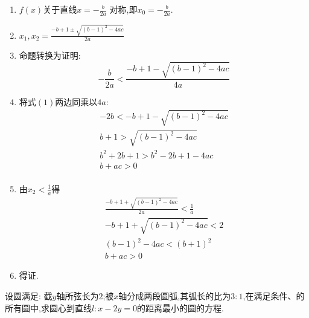 \begin{questions}
\begin{solution}
\begin{penum}
			\item
			\begin{enumerate}[label=\protect\circled{\arabic*}]
				\item $f(x)$关于直线$x=-\frac{b}{2a}$ 对称,即$x_0 = -\frac{b}{2a}$.
				\item $x_1, x_2=\frac{-b + 1 \pm \sqrt{(b-1)^2-4ac}}{2a}$
				\item 命题转换为证明:
				      \begin{equation*}
					      -\frac{b}{2a} < \frac{-b + 1 - \sqrt{(b-1)^2 - 4ac}}{4a} \tag{1}
				      \end{equation*}
				\item 将式$(1)$两边同乘以$4a$:
				      \begin{align*}
					      -2b < -b + 1 - \sqrt{(b-1)^2 - 4ac} \\
					      b + 1 > \sqrt{(b-1)^2 - 4ac}        \\
					      b^2 + 2b + 1 > b^2 - 2b + 1 - 4ac   \\
					      b + ac > 0                          \\
				      \end{align*}
				\item 由$x_2 < \frac1a$得
				      \begin{align*}
					      \frac{-b + 1 + \sqrt{(b-1)^2 - 4ac}}{2a} < \frac1a \\
					      -b + 1 + \sqrt{(b-1)^2 - 4ac} < 2                  \\
					      (b-1)^2 - 4ac < (b+1)^2                            \\
					      b + ac > 0
				      \end{align*}
				\item 得证.
			\end{enumerate}
		\end{penum}
	\end{solution}

	\question 设圆满足:
	截$y$轴所弦长为$2$;被$x$轴分成两段圆弧,其弧长的比为$3:1$,在满足条件、的所有圆中,求圆心到直线$l:x-2y=0$的距离最小的圆的方程.


\end{questions}
